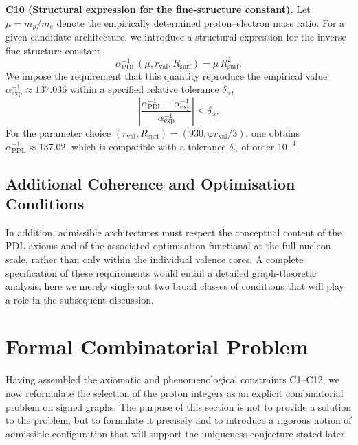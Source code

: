 \documentclass[11pt,a4paper]{article}
\begin{document}
\medskip
\noindent\textbf{C10 (Structural expression for the fine-structure constant).} Let $\mu=m_p/m_e$ denote the empirically determined proton–electron mass ratio. For a given candidate architecture, we introduce a structural expression for the inverse fine-structure constant,
\begin{equation}
\alpha_{\mathrm{PDL}}^{-1}(\mu,r_{\mathrm{val}},R_{\mathrm{surf}}) = \mu\,R_{\mathrm{surf}}^{2}.
\end{equation}
We impose the requirement that this quantity reproduce the empirical value $\alpha_{\mathrm{exp}}^{-1}\approx 137.036$ within a specified relative tolerance $\delta_{\alpha}$,
\begin{equation}
\left|\frac{\alpha_{\mathrm{PDL}}^{-1}-\alpha_{\mathrm{exp}}^{-1}}{\alpha_{\mathrm{exp}}^{-1}}\right| \leq \delta_{\alpha}.
\end{equation}
For the parameter choice $(r_{\mathrm{val}},R_{\mathrm{surf}})=(930,\varphi r_{\mathrm{val}}/3)$, one obtains $\alpha_{\mathrm{PDL}}^{-1}\approx 137.02$, which is compatible with a tolerance $\delta_{\alpha}$ of order $10^{-4}$.\cite{LaubscherDerivationAlpha2026}

\subsection{Additional Coherence and Optimisation Conditions}

In addition, admissible architectures must respect the conceptual content of the PDL axioms and of the associated optimisation functional at the full nucleon scale, rather than only within the individual valence cores. A complete specification of these requirements would entail a detailed graph-theoretic analysis; here we merely single out two broad classes of conditions that will play a role in the subsequent discussion.

\section{Formal Combinatorial Problem}
\label{sec:comb_problem}

Having assembled the axiomatic and phenomenological constraints C1–C12, we now reformulate the selection of the proton integers as an explicit combinatorial problem on signed graphs. The purpose of this section is not to provide a solution to the problem, but to formulate it precisely and to introduce a rigorous notion of admissible configuration that will support the uniqueness conjecture stated later.
\end{document}
